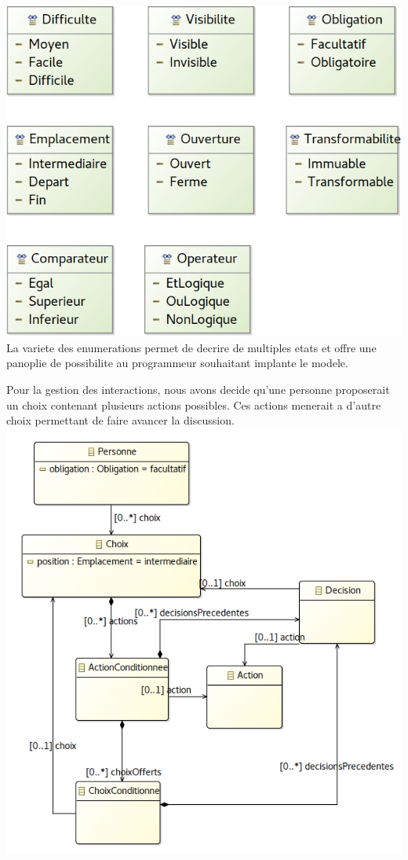 \documentclass[12pt]{article}
\begin{document}
\includegraphics[width=\textwidth]{images/diagram_Enums}
\newline\newline
La variete des enumerations permet de decrire de multiples etats et offre une panoplie de possibilite au programmeur souhaitant implante le modele.

Pour la gestion des interactions, nous avons decide qu'une personne proposerait un choix contenant plusieurs actions possibles. Ces actions menerait a d'autre choix permettant de faire avancer la discussion.
\newline\newline
\includegraphics[width=\textwidth]{images/diagram_Interaction}
\newline\newline
\end{document}
